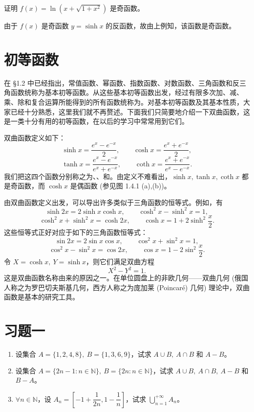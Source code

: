 \documentclass[UTF8,12pt,a4paper,fontset=fandol]{ctexbook}
\begin{document}
\noindent{}\quad 证明 $f(x)=\ln(x+\sqrt{1+x^2})$ 是奇函数。

\noindent{}\quad 由于 $f(x)$ 是奇函数 $y=\sinh x$ 的反函数，故由上例知，该函数是奇函数。

\section{初等函数}

在 §1.2 中已经指出，常值函数、幂函数、指数函数、对数函数、三角函数和反三角函数统称为基本初等函数。从这些基本初等函数出发，经过有限多次加、减、乘、除和复合运算所能得到的所有函数统称为。对基本初等函数及其基本性质，大家已经十分熟悉，这里我们就不再赘述。下面我们只简要地介绍一下双曲函数，这是一类十分有用的初等函数，在以后的学习中常常用到它们。

双曲函数定义如下：
\[
  \sinh x=\frac{e^x-e^{-x}}{2},\qquad
  \cosh x=\frac{e^x+e^{-x}}{2},
\]
\[
  \tanh x=\frac{e^x-e^{-x}}{e^x+e^{-x}},\qquad
  \coth x=\frac{e^x+e^{-x}}{e^x-e^{-x}}.
\]
我们把这四个函数分别称之为、、和。由定义不难看出，$\sinh x,\tanh x,\coth x$ 都是奇函数，而 $\cosh x$ 是偶函数 (参见图 1.4.1 (a),(b))。

由双曲函数定义出发，可以导出许多类似于三角函数的恒等式。例如，有
\[
  \sinh 2x=2\sinh x\cosh x,\qquad
  \cosh^2x-\sinh^2x=1,
\]
\[
  \cosh^2x+\sinh^2x=\cosh 2x,\qquad
  \cosh x=1+2\sinh^2\frac x2.
\]
这些恒等式正好对应于如下的三角函数恒等式：
\[
  \sin 2x=2\sin x\cos x,\qquad
  \cos^2x+\sin^2x=1,
\]
\[
  \cos^2x-\sin^2x=\cos 2x,\qquad
  \cos x=1-2\sin^2\frac x2.
\]
令 $X=\cosh x,\ Y=\sinh x$，则它们满足双曲方程
\[
  X^2-Y^2=1.
\]
这是双曲函数名称由来的原因之一。在单位圆盘上的非欧几何——双曲几何 (俄国人称之为罗巴切夫斯基几何，西方人称之为庞加莱 (Poincaré) 几何) 理论中，双曲函数是基本的研究工具。

\section*{习题一}

\begin{enumerate}
  \item 设集合 $A=\{1,2,4,8\},\ B=\{1,3,6,9\}$，试求 $A\cup B,\ A\cap B$ 和 $A-B$。
  \item 设集合 $A=\{2n-1:n\in\mathbb{N}\},\ B=\{2n:n\in\mathbb{N}\}$，试求 $A\cup B,\ A\cap B,\ A-B$ 和 $B-A$。
  \item $\forall n\in\mathbb{N}$，设 $A_n=\left[-1+\dfrac{1}{2n},1-\dfrac1n\right]$，试求 $\displaystyle\bigcup_{n=1}^{+\infty}A_n$。
\end{enumerate}
\end{document}
